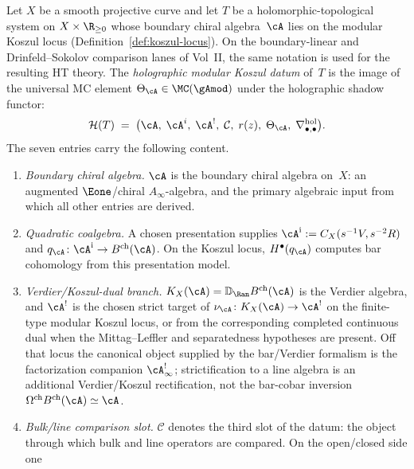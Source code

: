 \begin{definition}

\label{def:holographic-modular-koszul-datum}
Let $X$ be a smooth projective curve and let $T$ be a
holomorphic-topological system on $X\times\R_{\ge 0}$ whose boundary
chiral algebra~$\cA$ lies on the modular Koszul locus
\textup{(}Definition~\ref{def:koszul-locus}\textup{)}. On the
boundary-linear and Drinfeld--Sokolov comparison lanes of Vol~II, the
same notation is used for the resulting HT theory. The
\emph{holographic modular Koszul datum} of~$T$ is the image of the
universal MC element $\Theta_\cA \in \MC(\gAmod)$ under the holographic
shadow functor:
\begin{equation}\label{eq:holographic-datum}
\mathcal{H}(T)
\;=\;
\bigl(\cA,\;\cA^i,\;\cA^!,\;\mathcal{C},\;r(z),\;\Theta_\cA,\;
 \nabla^{\mathrm{hol}}_{\bullet,\bullet}\bigr).
\end{equation}
The seven entries carry the following content.
\begin{enumerate}[label=\textup{(\roman*)}]
\item \emph{Boundary chiral algebra.}
 $\cA$ is the boundary chiral algebra on~$X$: an augmented
 $\Eone$/chiral $A_\infty$-algebra, and the primary algebraic
 input from which all other entries are derived.
\item \emph{Quadratic coalgebra.}
 A chosen presentation supplies
 $\cA^{\mathrm i}:=C_X(s^{-1}V,s^{-2}R)$ and
 $q_\cA\colon\cA^{\mathrm i}\to B^{\mathrm{ch}}(\cA)$.
 On the Koszul locus, $H^\bullet(q_\cA)$ computes bar cohomology from
 this presentation model.
\item \emph{Verdier/Koszul-dual branch.}
 $K_X(\cA)=\mathbb D_{\Ran}B^{\mathrm{ch}}(\cA)$ is the Verdier
 algebra, and $\cA^!$ is the chosen strict target of
 $\nu_\cA\colon K_X(\cA)\to\cA^!$ on the finite-type modular Koszul
 locus, or from the corresponding
 completed continuous dual when the Mittag--Leffler and separatedness
 hypotheses are present.  Off that locus the canonical object supplied
 by the bar/Verdier formalism is the factorization companion
 $\cA^{!}_\infty$; strictification to a line algebra is an additional
 Verdier/Koszul rectification, not the bar-cobar inversion
 $\Omega^{\mathrm{ch}}B^{\mathrm{ch}}(\cA)\simeq\cA$.
\item \emph{Bulk/line comparison slot.}
 $\mathcal{C}$ denotes the third slot of the datum: the object through
 which bulk and line operators are compared. On the open/closed side one

\end{enumerate}
\end{definition}
